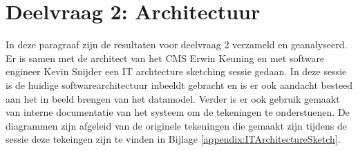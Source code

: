 \section{Deelvraag 2: Architectuur}
In deze paragraaf zijn de resultaten voor deelvraag 2 \textit{\SubquestionTwo} verzameld en geanalyseerd.
Er is samen met de architect van het CMS Erwin Keuning en met software engineer Kevin Snijder een IT archtecture sketching sessie gedaan.
In deze sessie is de huidige softwarearchitectuur inbeeldt gebracht en is er ook aandacht besteed aan het in beeld brengen van het datamodel.
Verder is er ook gebruik gemaakt van interne documentatie van het systeem om de tekeningen te onderstuenen.
De diagrammen zijn afgeleid van de originele tekeningen die gemaakt zijn tijdens de sessie deze tekeingen zijn te vinden in Bijlage \ref{appendix:ITArchitectureSketch}.

